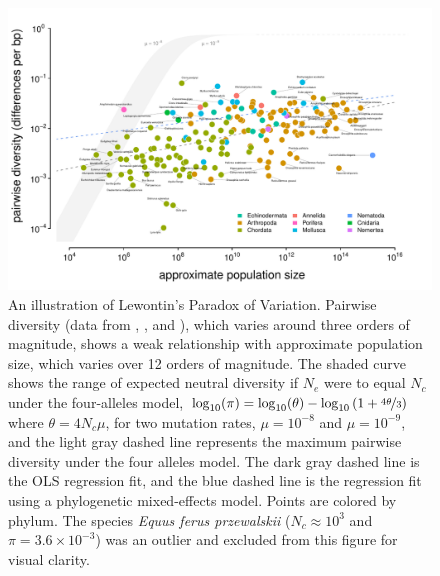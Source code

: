 \documentclass[11pt]{article}
\newcommand{\logt}{\log_{10}}
\begin{document}
\begin{figure}[t!]
  \centering
  \includegraphics[width=\textwidth]{figures/diversity_popsize_full.pdf}

  \caption{An illustration of Lewontin's Paradox of Variation. Pairwise
    diversity (data from \cite{Leffler2012-zj}, \cite{Corbett-Detig2015-gt},
    and \cite{Romiguier2014-bp}), which varies around three orders of
    magnitude, shows a weak relationship with approximate population size,
    which varies over 12 orders of magnitude.  The shaded curve shows the range
    of expected neutral diversity if $N_e$ were to equal $N_c$ under the
    four-alleles model, $\log_{10}(\pi) = \logt(\theta) - \logt{(1 +
    \nicefrac{4\theta}{3})}$ where $\theta = 4N_c \mu$, for two mutation rates,
    $\mu = 10^{-8}$ and $\mu = 10^{-9}$, and the light gray dashed line
    represents the maximum pairwise diversity under the four alleles model. The
    dark gray dashed line is the OLS regression fit, and the blue dashed line
    is the regression fit using a phylogenetic mixed-effects model.  Points are
    colored by phylum. The species \emph{Equus ferus przewalskii} ($N_c \approx
  10^3$ and $\pi = 3.6 \times 10^{-3}$) was an outlier and excluded from this
figure for visual clarity.}

  \label{fig:figure-1}
\end{figure}
\end{document}
